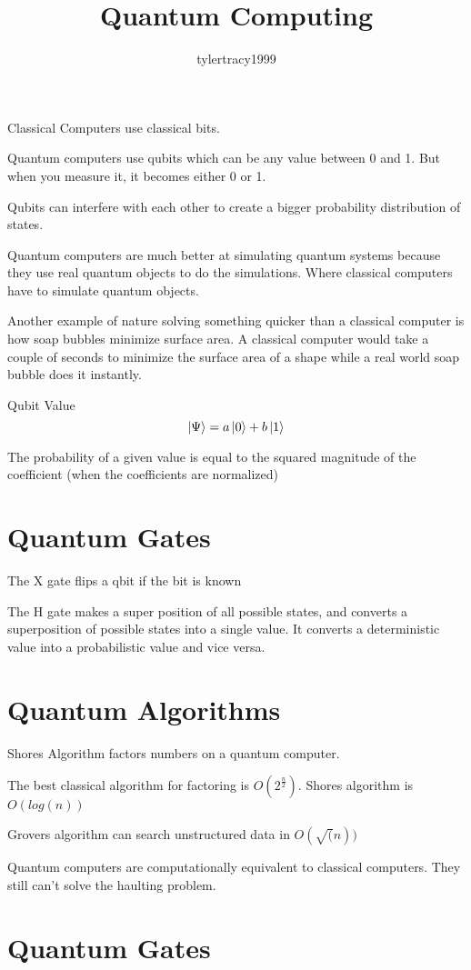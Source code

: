\documentclass{article}
\title{Quantum Computing}
\author{tylertracy1999 }
\begin{document}
\maketitle

Classical Computers use classical bits.

Quantum computers use qubits which can be any value between 0 and 1. But when you measure it, it becomes either 0 or 1.

Qubits can interfere with each other to create a bigger probability distribution of states.

Quantum computers are much better at simulating quantum systems because they use real quantum objects to do the simulations. Where classical computers have to simulate quantum objects.

Another example of nature solving something quicker than a classical computer is how soap bubbles minimize surface area. A classical computer would take a couple of seconds to minimize the surface area of a shape while a real world soap bubble does it instantly.



Qubit Value
$$ \ket{\Psi} = a \ket{0} + b \ket{1} $$

The probability of a given value is equal to the squared magnitude of the coefficient (when the coefficients are normalized)

\section{Quantum Gates}

The X gate flips a qbit if the bit is known

The H gate makes a super position of all possible states, and converts a superposition of possible states into a single value. It converts a deterministic value into a probabilistic value and vice versa.

\section{Quantum Algorithms}

Shores Algorithm factors numbers on a quantum computer.

The best classical algorithm for factoring is $O(2^\frac{n}{2})$.
Shores algorithm is $O(log(n))$

Grovers algorithm can search unstructured data in $O(\sqrt(n))$

Quantum computers are computationally equivalent to classical computers. They still can't solve the haulting problem.




\section{Quantum Gates}
\end{document}
